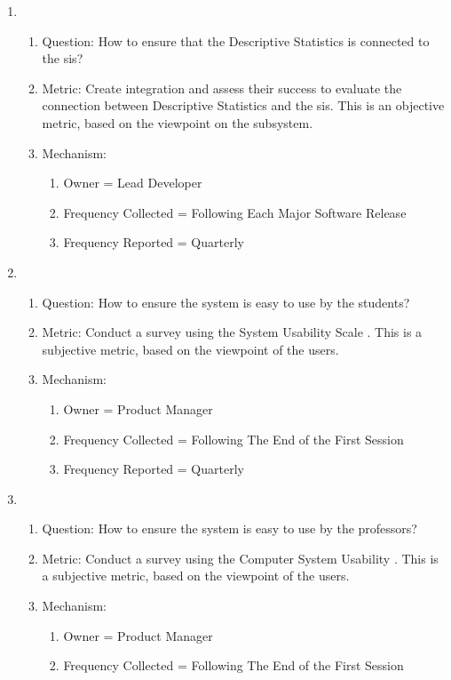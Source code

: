 \documentclass[11pt]{article}
\begin{document}
    
\begin{enumerate}
\item
   \begin{enumerate}
	\item Question: How to ensure that the Descriptive Statistics is connected to the \gls{sis}?
    \item Metric: Create \gls{integration} and assess their success to evaluate the connection between Descriptive Statistics and the \gls{sis}. This is an objective metric, based on the viewpoint on the subsystem.
    \item Mechanism:
    \begin{enumerate}
    \item Owner = Lead Developer
    \item Frequency Collected = Following Each Major Software Release
    \item Frequency Reported = Quarterly
    \end{enumerate}
\end{enumerate}
\item
    \begin{enumerate}
    \item Question: How to ensure the system is easy to use by the students?
    \item Metric: Conduct a survey using the System Usability Scale \cite{mifsud}. This is a subjective metric, based on the viewpoint of the users.
    \item Mechanism:
	\begin{enumerate}
    \item Owner = Product Manager
    \item Frequency Collected = Following The End of the First Session
    \item Frequency Reported = Quarterly
    \end{enumerate}
\end{enumerate}
\item
	\begin{enumerate}
    \item Question: How to ensure the system is easy to use by the professors?
    \item Metric: Conduct a survey using the Computer System Usability \cite{mifsud}. This is a subjective metric, based on the viewpoint of the users.
    \item Mechanism:
	\begin{enumerate}
    \item Owner = Product Manager
    \item Frequency Collected = Following The End of the First Session

\end{enumerate}
\end{enumerate}
\end{enumerate}
\end{document}
